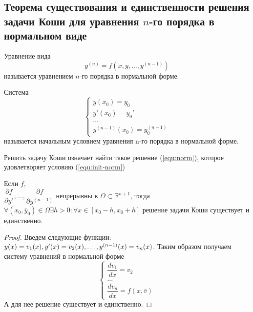 \subsection{Теорема существования и единственности решения задачи Коши для уравнения $n$-го порядка в нормальном виде}

\begin{definition}
    Уравнение вида
    \begin{equation}
        \label{equ:norm}
        y^{(n)} = f(x, y, \dots, y^{(n-1)})
    \end{equation}
    называется уравнением $n$-го порядка в нормальной форме.
\end{definition}

\begin{definition}
    Система
    \begin{equation}
        \label{equ:init-norm}
        \begin{cases*}
            y(x_0) = y_0\\
            y'(x_0) = y_0'\\
            \dots \\
            y^{(n-1)}(x_0) = y^{(n-1)}_0
        \end{cases*}
    \end{equation}
    называется начальным условием уравнения n-го порядка в нормальной форме.
\end{definition}

\begin{proposition}
    Решить задачу Коши означает найти такое решение (\ref{equ:norm}), которое удовлетворяет условию (\ref{equ:init-norm})
\end{proposition}

\begin{theorem}
    Если $f$, \\ $\dfrac{\partial f}{\partial y'}, \dots, \dfrac{\partial f}{\partial y^{(n-1)}}$ непрерывны в $\Omega \subset \mathbb{R}^{n+1}$, тогда $\forall (x_0, \bar{y}_0) \in \Omega \exists h > 0: \forall x\in [x_0 - h, x_0 + h]$ решение задачи Коши существует и единственно.
\end{theorem}

\begin{proof}
    Введем следующие функции: $y(x) = v_1(x), y'(x) = v_2(x), \dots, y^{(n-1)}(x) \hm= v_n(x)$. Таким образом получаем систему уравнений в нормальной форме
    \begin{equation}
        \begin{cases*}
            \dfrac{dv_1}{dx} = v_2\\
            \dots\\
            \dfrac{dv_n}{dx} = f(x, \bar{v})
        \end{cases*}
    \end{equation}
    А для нее решение существует и единственно.
\end{proof}
